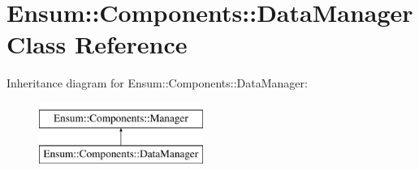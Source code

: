 \hypertarget{class_ensum_1_1_components_1_1_data_manager}{}\section{Ensum\+:\+:Components\+:\+:Data\+Manager Class Reference}
\label{class_ensum_1_1_components_1_1_data_manager}
Inheritance diagram for Ensum\+:\+:Components\+:\+:Data\+Manager\+:\begin{figure}[H]
\begin{center}
\leavevmode
\includegraphics[height=2.000000cm]{class_ensum_1_1_components_1_1_data_manager}
\end{center}
\end{figure}
